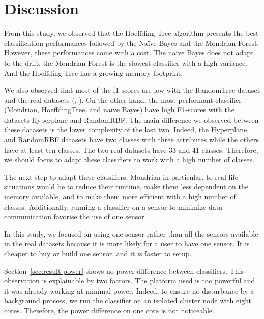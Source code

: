\section{Discussion}

From this study, we observed that the Hoeffding Tree algorithm presents the
best classification performances followed by the Naïve Bayes and the Mondrian
Forest.  However, these performances come with a cost.  The naïve Bayes does
not adapt to the drift, the Mondrian Forest is the slowest classifier with a
high variance. And the Hoeffding Tree has a growing memory footprint.

We also observed that most of the f1-scores are low with the RandomTree dataset and
the real datasets (\banosdataset, \recofitdataset). On the other hand, the most
performant classifier (Mondrian, HoeffdingTree, and naïve Bayes) have high
F1-scores with the datasets Hyperplane and RandomRBF. The main difference we
observed between these datasets is the lower complexity of the last two.
Indeed, the Hyperplane and RandomRBF datasets have two classes with three
attributes while the others have at least ten classes. The two real datasets
have 33 and 41 classes. Therefore, we should focus to adapt these classifiers
to work with a high number of classes.

The next step to adapt these classifiers, Mondrian in particular, to real-life
situations would be to reduce their runtime, make them less dependent on the
memory available, and to make them more efficient with a high number of
classes. Additionally, running a classifier on a sensor to minimize data
communication favorise the use of one sensor.


In this study, we focused on using one sensor rather than all the sensors
available in the real datasets because it is more likely for a user to have one
sensor. It is cheaper to buy or build one sensor, and it is faster to setup.


Section~\ref{sec:result-power} shows no power difference between classifiers. This
observation is explainable by two factors. The platform used is too powerful
and it was already working at minimal power. Indeed, to ensure no disturbance
by a background process, we run the classifier on an isolated cluster node with
eight cores. Therefore, the power difference on one core is not noticeable.

